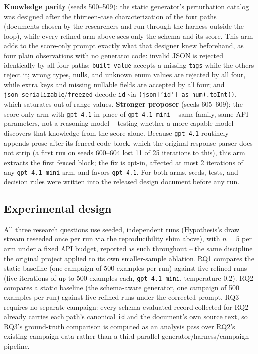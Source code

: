 \textbf{Knowledge parity} (seeds 500--509)\label{sec:knowledge-parity}: the
static generator's perturbation catalog was designed after the thirteen-case
characterization of the four paths (documents chosen by the researchers and
run through the harness outside the loop), while every refined arm above sees only
the schema and its score. This arm adds to the score-only prompt exactly what
that designer knew beforehand, as four plain observations with no generator
code: invalid JSON is rejected identically by all four paths;
\texttt{built\_value} accepts a missing \texttt{tags} while the others
reject it; wrong types, nulls, and unknown enum values are rejected by all
four, while extra keys and missing nullable fields are accepted by all four;
and \texttt{json\_serializable}/\texttt{freezed} decode \texttt{id} via
\texttt{(json['id'] as num).toInt()}, which saturates out-of-range values.
\textbf{Stronger proposer} (seeds 605--609): the score-only arm with
\texttt{gpt-4.1} in place of \texttt{gpt-4.1-mini} -- same family, same API
parameters, not a reasoning model -- testing whether a more capable model
discovers that knowledge from the score alone. Because \texttt{gpt-4.1}
routinely appends prose after its fenced code block, which the original
response parser does not strip (a first run on seeds 600--604 lost 11 of 25
iterations to this), this arm extracts the first fenced block; the fix is
opt-in, affected at most 2 iterations of any \texttt{gpt-4.1-mini} arm, and
favors \texttt{gpt-4.1}. For both arms, seeds, tests, and decision rules were
written into the released design document before any run.

\subsection{Experimental design}
All three research questions use seeded, independent runs (Hypothesis's
draw stream reseeded once per run via the reproducibility shim above), with
$n{=}5$ per arm under a fixed API budget, reported as such throughout --
the same discipline the original project applied to its own smaller-sample
ablation. RQ1 compares the static baseline (one campaign of 500
examples per run) against five refined runs (five iterations of up
to 500 examples each, \texttt{gpt-4.1-mini}, temperature 0.2). RQ2 compares
a static baseline (the schema-aware generator, one campaign of 500
examples per run) against five refined runs under the corrected prompt.
RQ3 requires no separate campaign: every schema-evaluated record collected
for RQ2 already carries each path's canonical \texttt{id} and the
document's own source text, so RQ3's ground-truth comparison is computed as
an analysis pass over RQ2's existing campaign data rather than a third parallel
generator/harness/campaign pipeline.
